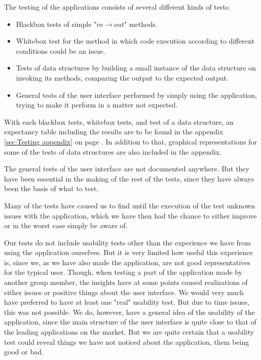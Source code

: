 The testing of the applications consists of several different kinds of tests:
\begin{itemize}
	\item Blackbox tests of simple "$in \rightarrow out$" methods.
	\item Whitebox test for the method in which code execution according to different conditions could be an issue.
	\item Tests of data structures by building a small instance of the data structure on invoking its methods, comparing the output to the expected output.
	\item General tests of the user interface performed by simply using the application, trying to make it perform in a matter not expected.
\end{itemize}
With each blackbox tests, whitebox tests, and test of a data structure, an expectancy table including the results are to be found in the appendix \ref{sec:Testing appendix} on page \pageref{sec:Testing appendix}. In addition to that, graphical representations for some of the tests of data structures are also included in the appendix.

The general tests of the user interface are not documented anywhere. But they have been essential in the making of the rest of the tests, since they have always been the basis of what to test.

Many of the tests have caused us to find until the execution of the test unknown issues with the application, which we have then had the chance to either improve or in the worst case simply be aware of.

Our tests do not include usability tests other than the experience we have from using the application ourselves. But it is very limited how useful this experience is, since we, as we have also made the application, are not good representatives for the typical user. Though, when testing a part of the application made by another group member, the insights have at some points caused realizations of either issues or positive things about the user interface. We would very much have preferred to have at least one "real" usability test. But due to time issues, this was not possible. We do, however, have a general idea of the usability of the application, since the main structure of the user interface is quite close to that of the leading applications on the market. But we are quite certain that a usability test could reveal things we have not noticed about the application, them being good or bad.